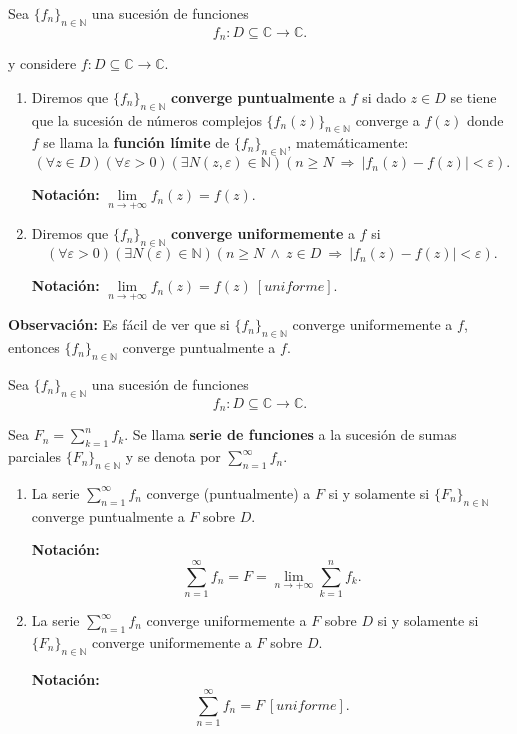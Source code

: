 \begin{defi}
Sea $\{f_n\}_{n \in \mathbb{N}}$ una sucesión de funciones 
$$f_n: D \subseteq \mathbb{C} \longrightarrow \mathbb{C}.$$

y considere $f: D \subseteq \mathbb{C} \longrightarrow \mathbb{C}$.

\begin{enumerate}
    \item Diremos que $\{f_n\}_{n \in \mathbb{N}}$ \textbf{converge puntualmente} a $f$ si dado $z \in D$ se tiene que la sucesión de números complejos $\{f_n(z)\}_{n \in \mathbb{N}}$ converge a $f(z)$ donde $f$ se llama la \textbf{función límite} de $\{f_n\}_{n \in \mathbb{N}}$, matemáticamente:
    $$(\forall z \in D)(\forall \varepsilon > 0)(\exists N(z,\varepsilon) \in \mathbb{N})(n \geq N ~\Rightarrow~ |f_n(z) - f(z)| < \varepsilon).$$
    
    \textbf{Notación:} $\lim\limits_{n \to + \infty} f_n(z) = f(z)$.
    
    \item  Diremos que $\{f_n\}_{n \in \mathbb{N}}$ \textbf{converge uniformemente} a $f$ si 
     $$(\forall \varepsilon > 0)(\exists N(\varepsilon) \in \mathbb{N})(n \geq N ~\wedge~  z \in D ~\Rightarrow~ |f_n(z) - f(z)| < \varepsilon).$$
     
     \textbf{Notación:} $\lim\limits_{n \to + \infty} f_n(z) = f(z) ~[uniforme]$.
\end{enumerate}
\end{defi}

\textbf{Observación:} Es fácil de ver que si $\{f_n\}_{n\in \mathbb{N}}$ converge uniformemente a $f$, entonces $\{f_n\}_{n\in \mathbb{N}}$ converge puntualmente a $f$.

\begin{defi}
Sea $\{f_n\}_{n \in \mathbb{N}}$ una sucesión de funciones
$$f_n: D \subseteq \mathbb{C} \longrightarrow \mathbb{C}.$$

Sea $F_n = \sum\limits_{k=1}^n f_k$. Se llama \textbf{serie de funciones} a la sucesión de sumas parciales $\{F_n\}_{n\in\mathbb{N}}$ y se denota por $\sum\limits_{n=1}^{\infty} f_n$.

\begin{enumerate}
    \item La serie $\sum\limits_{n=1}^{\infty} f_n$ converge (puntualmente) a $F$ si y solamente si $\{F_n\}_{n \in \mathbb{N}}$ converge puntualmente a $F$ sobre $D$.
    
    \textbf{Notación:} 
    $$\sum_{n=1}^{\infty} f_n = F = \lim_{n\to + \infty} \sum_{k=1}^n f_k.$$
    
    \item La serie $\sum\limits_{n=1}^{\infty} f_n$ converge uniformemente a $F$  sobre $D$ si y solamente si $\{F_n\}_{n \in \mathbb{N}}$ converge uniformemente a $F$ sobre $D$.
    
    \textbf{Notación:} 
    $$\sum_{n=1}^{\infty} f_n = F ~[uniforme].$$
    
\end{enumerate}
\end{defi}

